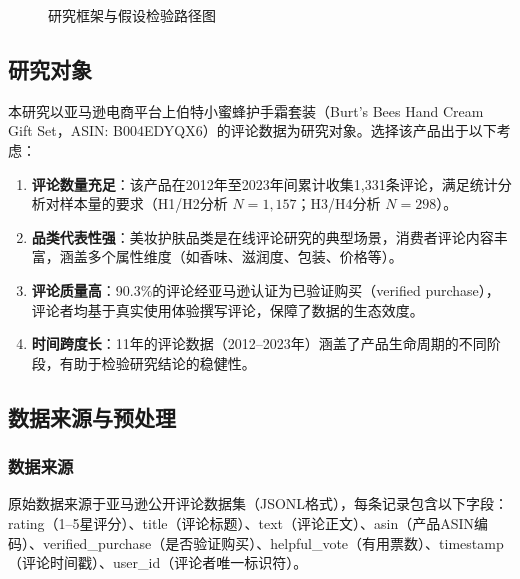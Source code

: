 \begin{figure}[htbp]

\caption{研究框架与假设检验路径图}
\label{fig:research_framework}
\end{figure}

\subsection{研究对象}

本研究以亚马逊电商平台上伯特小蜜蜂护手霜套装（Burt's Bees Hand Cream Gift Set，ASIN: B004EDYQX6）的评论数据为研究对象。选择该产品出于以下考虑：

\begin{enumerate}
  \item \textbf{评论数量充足}：该产品在2012年至2023年间累计收集1{,}331条评论，满足统计分析对样本量的要求（H1/H2分析 $N=1{,}157$；H3/H4分析 $N=298$）。
  \item \textbf{品类代表性强}：美妆护肤品类是在线评论研究的典型场景，消费者评论内容丰富，涵盖多个属性维度（如香味、滋润度、包装、价格等）。
  \item \textbf{评论质量高}：90.3\%的评论经亚马逊认证为已验证购买（verified purchase），评论者均基于真实使用体验撰写评论，保障了数据的生态效度。
  \item \textbf{时间跨度长}：11年的评论数据（2012--2023年）涵盖了产品生命周期的不同阶段，有助于检验研究结论的稳健性。
\end{enumerate}

\subsection{数据来源与预处理}

\subsubsection{数据来源}

原始数据来源于亚马逊公开评论数据集（JSONL格式），每条记录包含以下字段：rating（1--5星评分）、title（评论标题）、text（评论正文）、asin（产品ASIN编码）、verified\_purchase（是否验证购买）、helpful\_vote（有用票数）、timestamp（评论时间戳）、user\_id（评论者唯一标识符）。

